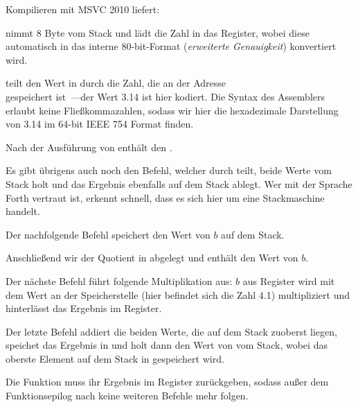 
Kompilieren mit MSVC 2010 liefert:



\FLD nimmt 8 Byte vom Stack und lädt die Zahl in das  Register, wobei
diese automatisch in das interne 80-bit-Format (\emph{erweiterte Genauigkeit})
konvertiert wird.

\FDIV teilt den Wert in  durch die Zahl, die an der Adresse\\
 gespeichert ist~---der Wert 3.14 ist hier
kodiert.
Die Syntax des Assemblers erlaubt keine Fließkommazahlen, sodass wir hier die
hexadezimale Darstellung von 3.14 im 64-bit IEEE 754 Format finden.

Nach der Ausführung von \FDIV enthält  den .

Es gibt übrigens auch noch den \FDIVP Befehl, welcher  durch 
teilt, beide Werte vom Stack holt und das Ergebnis ebenfalls auf dem Stack
ablegt.
Wer mit der Sprache Forth vertraut ist, erkennt schnell, dass es sich
hier um eine Stackmaschine handelt.

Der nachfolgende \FLD Befehl speichert den Wert von $b$ auf dem Stack.

Anschließend wir der Quotient in  abgelegt und  enthält den Wert von
$b$.

Der nächste \FMUL Befehl führt folgende Multiplikation aus: $b$ aus Register
 wird mit dem Wert an der Speicherstelle 
(hier befindet sich die Zahl 4.1) multipliziert und hinterlässt das Ergebnis im
 Register.

Der letzte \FADDP Befehl addiert die beiden Werte, die auf dem Stack zuoberst
liegen, speichet das Ergebnis in  und holt dann den Wert von  vom
Stack, wobei das oberste Element auf dem Stack in  gespeichert wird.

Die Funktion muss ihr Ergebnis im  Register zurückgeben, sodass außer dem
Funktionsepilog nach \FADDP keine weiteren Befehle mehr folgen.



